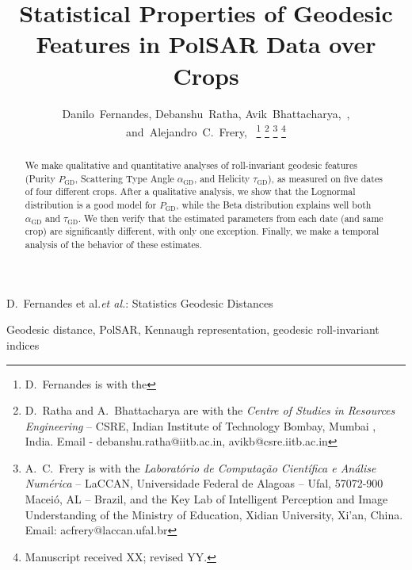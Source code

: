 \documentclass[journal]{IEEEtran}
\begin{document}
	
	\title{Statistical Properties of Geodesic Features in PolSAR Data over Crops}
	
	\author{Danilo~Fernandes,
		Debanshu~Ratha,
		Avik~Bhattacharya,~,
		and~Alejandro~C.~Frery,~%
		\thanks{D.\ Fernandes is with the}%
		\thanks{D.\ Ratha and A.\ Bhattacharya are with the \textit{Centre of Studies in Resources Engineering}
			-- CSRE, Indian Institute of Technology Bombay, Mumbai , India. Email - debanshu.ratha@iitb.ac.in, avikb@csre.iitb.ac.in}%
		\thanks{A.\ C.\ Frery is with the \textit{Laborat\'orio de Computa\c c\~ao Cient\'ifica e An\'alise Num\'erica} -- LaCCAN, 
			Universidade Federal de Alagoas -- Ufal, 
			57072-900 Macei\'o, AL -- Brazil, and the Key Lab of Intelligent Perception and Image Understanding of the Ministry of Education, Xidian University, Xi'an, China. Email: acfrery@laccan.ufal.br}
		\thanks{Manuscript received XX; revised YY.}}
	
	{D.\ Fernandes et al.\MakeLowercase{\textit{et al.}}: Statistics Geodesic Distances}
	
	\maketitle
	
	\begin{abstract}
		We make qualitative and quantitative analyses of roll-invariant geodesic features (Purity $P_{\text{GD}}$, Scattering Type Angle $\alpha_{\text{GD}}$, and Helicity $\tau_{\text{GD}}$), as measured on five dates of four different crops.
		After a qualitative analysis, we show that the Lognormal distribution is a good model for $P_{\text{GD}}$, while the Beta distribution explains well both $\alpha_{\text{GD}}$ and $\tau_{\text{GD}}$.
		We then verify that the estimated parameters from each date (and same crop) are significantly different, with only one exception.
		Finally, we make a temporal analysis of the behavior of these estimates.
	\end{abstract}
	
	\begin{IEEEkeywords}
		Geodesic distance, PolSAR, Kennaugh representation, geodesic roll-invariant indices
	\end{IEEEkeywords}
	
	\IEEEpeerreviewmaketitle
	
\end{document}
